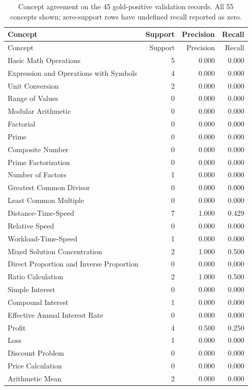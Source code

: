 \small\begin{longtable}{@{}p{.60\linewidth}rrr@{}}
\caption{Concept agreement on the 45 gold-positive validation records. All 55 concepts shown; zero-support rows have undefined recall reported as zero.}\label{tab:analyzerconcepts}\\
\toprule Concept & Support & Precision & Recall\\\midrule\endfirsthead
\toprule Concept & Support & Precision & Recall\\\midrule\endhead
Basic Math Operations & 5 & 0.000 & 0.000\\
Expression and Operations with Symbols & 4 & 0.000 & 0.000\\
Unit Conversion & 2 & 0.000 & 0.000\\
Range of Values & 0 & 0.000 & 0.000\\
Modular Arithmetic & 0 & 0.000 & 0.000\\
Factorial & 0 & 0.000 & 0.000\\
Prime & 0 & 0.000 & 0.000\\
Composite Number & 0 & 0.000 & 0.000\\
Prime Factorization & 0 & 0.000 & 0.000\\
Number of Factors & 1 & 0.000 & 0.000\\
Greatest Common Divisor & 0 & 0.000 & 0.000\\
Least Common Multiple & 0 & 0.000 & 0.000\\
Distance-Time-Speed & 7 & 1.000 & 0.429\\
Relative Speed & 0 & 0.000 & 0.000\\
Workload-Time-Speed & 1 & 0.000 & 0.000\\
Mixed Solution Concentration & 2 & 1.000 & 0.500\\
Direct Proportion and Inverse Proportion & 0 & 0.000 & 0.000\\
Ratio Calculation & 2 & 1.000 & 0.500\\
Simple Interest & 0 & 0.000 & 0.000\\
Compound Interest & 1 & 0.000 & 0.000\\
Effective Annual Interest Rate & 0 & 0.000 & 0.000\\
Profit & 4 & 0.500 & 0.250\\
Loss & 1 & 0.000 & 0.000\\
Discount Problem & 0 & 0.000 & 0.000\\
Price Calculation & 0 & 0.000 & 0.000\\
Arithmetic Mean & 2 & 0.000 & 0.000\\

\end{longtable}
